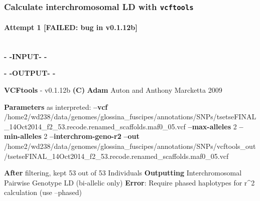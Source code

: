 \documentclass[letterpaper]{scrartcl}
\newenvironment{Shaded}{}{}
\newcommand{\KeywordTok}[1]{\textcolor[rgb]{0.00,0.44,0.13}{\textbf{{#1}}}}
\newcommand{\StringTok}[1]{\textcolor[rgb]{0.25,0.44,0.63}{{#1}}}
\newcommand{\OtherTok}[1]{\textcolor[rgb]{0.00,0.44,0.13}{{#1}}}
\newcommand{\NormalTok}[1]{{#1}}
\begin{document}
\subsubsection{Calculate interchromosomal LD with
\texttt{vcftools}}\label{calculate-interchromosomal-ld-with-vcftools}

\paragraph{Attempt 1 {[}FAILED: bug in
v0.1.12b{]}}\label{attempt-1-failed-bug-in-v0.1.12b}

~\\\textbf{- -INPUT- -}

\begin{Shaded}
\end{Shaded}

\textbf{- -OUTPUT- -}

\begin{Shaded}
\begin{Highlighting}[]
\KeywordTok{VCFtools} \NormalTok{- v0.1.12b}
\KeywordTok{(C)} \KeywordTok{Adam} \NormalTok{Auton and Anthony Marcketta 2009}

\KeywordTok{Parameters} \NormalTok{as interpreted:}
        \KeywordTok{--vcf} \NormalTok{/home2/wd238/data/genomes/glossina_fuscipes/annotations/SNPs/tsetseFINAL_14Oct2014_f2_53.recode.renamed_scaffolds.maf0_05.vcf}
        \KeywordTok{--max-alleles} \NormalTok{2}
        \KeywordTok{--min-alleles} \NormalTok{2}
        \KeywordTok{--interchrom-geno-r2}
        \KeywordTok{--out} \NormalTok{/home2/wd238/data/genomes/glossina_fuscipes/annotations/SNPs/vcftools_out/tsetseFINAL_14Oct2014_f2_53.recode.renamed_scaffolds.maf0_05.vcf}

\KeywordTok{After} \NormalTok{filtering, kept 53 out of 53 Individuals}
\KeywordTok{Outputting} \NormalTok{Interchromosomal Pairwise Genotype LD (bi-allelic only)}
\KeywordTok{Error}\NormalTok{: Require phased haplotypes for r^2 calculation (use --phased)}
\end{Highlighting}
\end{Shaded}
\end{document}
